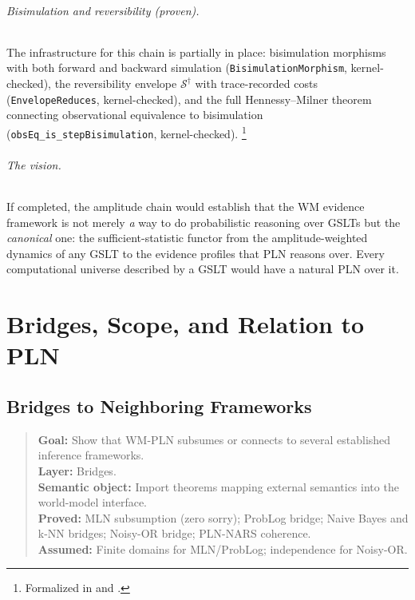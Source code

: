 \documentclass[11pt,openany]{report}
\begin{document}
\paragraph{Bisimulation and reversibility (proven).}
The infrastructure for this chain is partially in place:
bisimulation morphisms with both forward and backward simulation
(\texttt{BisimulationMorphism}, kernel-checked), the reversibility
envelope $\mathcal{S}^\dagger$ with trace-recorded costs
(\texttt{EnvelopeReduces}, kernel-checked), and the full
Hennessy--Milner theorem connecting observational equivalence to
bisimulation (\texttt{obsEq\_is\_stepBisimulation},
kernel-checked).%
\footnote{Formalized in
   and
  .}

\paragraph{The vision.}
If completed, the amplitude chain would establish that the WM evidence
framework is not merely \emph{a} way to do probabilistic reasoning over
GSLTs but the \emph{canonical} one: the sufficient-statistic functor
from the amplitude-weighted dynamics of any GSLT to the evidence profiles
that PLN reasons over.  Every computational universe described by a
GSLT would have a natural PLN over it.


\part{Bridges, Scope, and Relation to PLN}
\label{part:artifact}

\chapter{Bridges to Neighboring Frameworks}
\label{ch:bridges}

\begin{quote}\small
\textbf{Goal:} Show that WM-PLN subsumes or connects to several established inference frameworks.\\
\textbf{Layer:} Bridges.\\
\textbf{Semantic object:} Import theorems mapping external semantics into the world-model interface.\\
\textbf{Proved:} MLN subsumption (zero sorry); ProbLog bridge; Naive Bayes and k-NN bridges; Noisy-OR bridge; PLN-NARS coherence.\\
\textbf{Assumed:} Finite domains for MLN/ProbLog; independence for Noisy-OR.
\end{quote}
\end{document}
